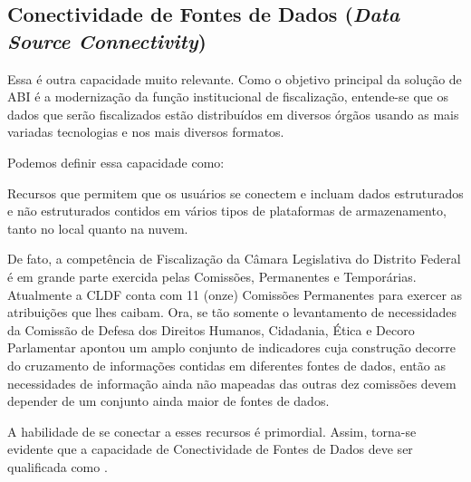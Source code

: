 \subsection{Conectividade de Fontes de Dados (\emph{Data Source Connectivity})}
\label{sub-connectivity}


Essa é outra capacidade muito relevante. Como o objetivo principal da solução de ABI é a modernização da função institucional de fiscalização, entende-se que os dados que serão fiscalizados estão distribuídos em diversos órgãos usando as mais variadas tecnologias e nos mais diversos formatos. 

Podemos definir essa capacidade como:

\begin{definition}
Recursos que permitem que os usuários se conectem e incluam dados estruturados e não estruturados contidos em vários tipos de plataformas de armazenamento, tanto no local quanto na nuvem.
\end{definition}

De fato, a competência de Fiscalização da Câmara Legislativa do Distrito Federal é em grande parte exercida pelas Comissões, Permanentes e Temporárias. Atualmente a CLDF conta com 11 (onze) Comissões Permanentes para exercer as atribuições que lhes caibam. Ora, se tão somente o levantamento de necessidades da Comissão de Defesa dos Direitos Humanos, Cidadania,
Ética e Decoro Parlamentar \cite{propostaCDDHCEDP} apontou um amplo conjunto de indicadores cuja construção decorre do cruzamento de informações contidas em diferentes fontes de dados, então as necessidades de informação ainda não mapeadas das outras dez comissões devem depender de um conjunto ainda maior de fontes de dados. 

A habilidade de se conectar a esses recursos é primordial. Assim, torna-se evidente que a capacidade de Conectividade de Fontes de Dados deve ser qualificada como \MUST.

